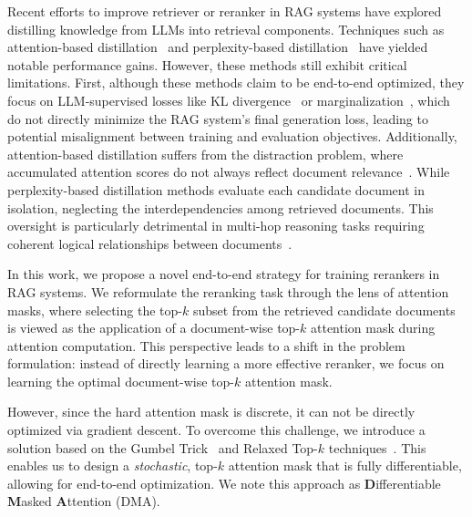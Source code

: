 Recent efforts to improve retriever or reranker in RAG systems have explored distilling knowledge from LLMs into retrieval components. Techniques such as attention-based distillation~\cite{DBLP:conf/iclr/IzacardG21} and perplexity-based distillation~\cite{DBLP:conf/nips/SachanRHDY21, DBLP:conf/naacl/ShiMYS0LZY24, DBLP:conf/iclr/Lin0CSL00KSLZY24, DBLP:journals/jmlr/IzacardLLHPSDJRG23, DBLP:conf/naacl/GlassRCNCG22} have yielded notable performance gains. However, these methods still exhibit critical limitations. First, although these methods claim to be end-to-end optimized, they focus on LLM-supervised losses like KL divergence~\cite{DBLP:journals/jmlr/IzacardLLHPSDJRG23, DBLP:conf/naacl/GlassRCNCG22} or marginalization~\cite{DBLP:conf/nips/SachanRHDY21, DBLP:conf/naacl/ShiMYS0LZY24, DBLP:conf/iclr/Lin0CSL00KSLZY24}, which do not directly minimize the RAG system’s final generation loss, leading to potential misalignment between training and evaluation objectives. Additionally, attention-based distillation suffers from the distraction problem, where accumulated attention scores do not always reflect document relevance~\cite{DBLP:conf/acl/KeK00MB24, DBLP:journals/corr/abs-2408-11745}. While perplexity-based distillation methods evaluate each candidate document in isolation, neglecting the interdependencies among retrieved documents. This oversight is particularly detrimental in multi-hop reasoning tasks requiring coherent logical relationships between documents~\cite{DBLP:journals/tacl/TrivediBKS22, DBLP:conf/coling/HoNSA20}.

In this work, we propose a novel end-to-end strategy for training rerankers in RAG systems. We reformulate the reranking task through the lens of attention masks, where selecting the top-$k$ subset from the retrieved candidate documents is viewed as the application of a document-wise top-$k$ attention mask during attention computation. This perspective leads to a shift in the problem formulation: instead of directly learning a more effective reranker, we focus on learning the optimal document-wise top-$k$ attention mask.

However, since the hard attention mask is discrete, it can not be directly optimized via gradient descent. To overcome this challenge, we introduce a solution based on the Gumbel Trick~\cite{DBLP:conf/iclr/JangGP17} and Relaxed Top-$k$ techniques~\cite{DBLP:conf/icml/ChenSWJ18}. This enables us to design a \textit{stochastic}, top-$k$ attention mask that is fully differentiable, allowing for end-to-end optimization. We note this approach as \textbf{D}ifferentiable \textbf{M}asked \textbf{A}ttention (DMA).

